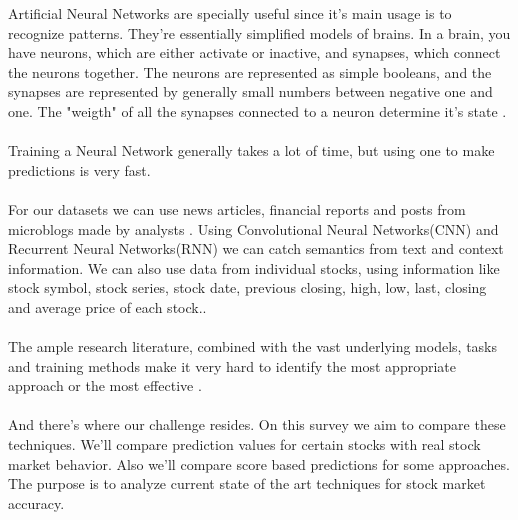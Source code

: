 \documentclass[conference]{IEEEtran}
\begin{document}
Artificial Neural Networks are specially useful since it's main usage is to recognize patterns. They're essentially simplified models of brains. In a brain, you have neurons, which are either activate or inactive,
and synapses, which connect the neurons together. The neurons are represented as simple booleans, and the synapses are represented by generally small numbers between negative one and one. The "weigth" of all the
synapses connected to a neuron determine it's state \cite{M2018}.
\\\\
Training a Neural Network generally takes a lot of time, but using one to make predictions is very fast.
\\\\
For our datasets we can use news articles, financial reports and posts from microblogs made by analysts \cite{Vargas2017}. Using Convolutional Neural Networks(CNN) and Recurrent Neural Networks(RNN) we can
catch semantics from text and context information. We can also use data from individual stocks, using information like stock symbol, stock series, stock date, previous closing, high, low, last, closing and average price of each stock.\cite{M2018}.
\\\\
The ample research literature, combined with the vast underlying models, tasks and training methods make it very
hard to identify the most appropriate approach or the most effective \cite{raghu2020survey}.
\\\\
And there's where our challenge resides. On this survey we aim to compare these techniques. We'll compare prediction values for certain stocks with real stock market behavior. Also we'll compare score based predictions for some approaches.
The purpose is to analyze current state of the art techniques for stock market accuracy\cite{Singh2016}.
\end{document}

